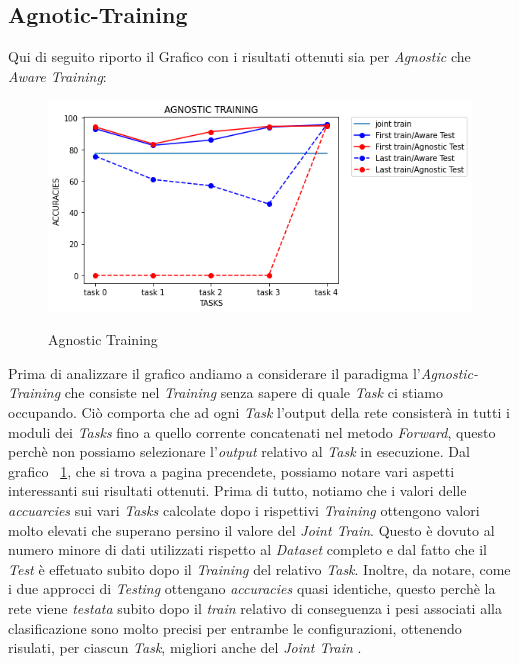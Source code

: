 \subsection{Agnotic-Training}
Qui di seguito riporto il Grafico con i risultati ottenuti sia per \textit{Agnostic} che \textit{Aware Training}: 
\begin{figure}[ht]
\centering
\caption{Agnostic Training}
\includegraphics[width=\linewidth]{Agnostic_Agnostic-Aware.png}
\label{figure : Angostic_training}
\end{figure}
\newpage
Prima di analizzare il grafico  andiamo a considerare il paradigma l'\textit{Agnostic-Training} che consiste nel \textit{Training}
senza sapere di quale \textit{Task} ci stiamo occupando.
Ciò comporta che ad ogni \textit{Task} l'output della rete consisterà in tutti i moduli dei \textit{Tasks} fino a quello corrente concatenati nel metodo \textit{Forward}, questo perchè non possiamo selezionare l'\textit{output} relativo al \textit{Task} in esecuzione.
\newline
Dal grafico ~\ref{figure : Angostic_training}, che si trova a pagina precendete, possiamo notare vari aspetti interessanti sui risultati ottenuti. Prima di tutto, notiamo che i valori delle \textit{accuarcies} sui vari \textit{Tasks} calcolate dopo i rispettivi \textit{Training} ottengono valori molto elevati che superano persino il valore del \textit{Joint Train}. Questo è dovuto al numero minore di dati utilizzati rispetto al \textit{Dataset} completo e dal fatto che il \textit{Test} è effetuato subito  dopo il \textit{Training} del relativo \textit{Task}. Inoltre, da notare, come i due approcci di \textit{Testing} ottengano \textit{accuracies} quasi identiche, questo perchè la rete viene \textit{testata} subito dopo il \textit{train} relativo di conseguenza i pesi associati alla clasificazione sono molto precisi per entrambe le configurazioni, ottenendo risulati, per ciascun \textit{Task}, migliori anche del \textit{Joint Train} .
